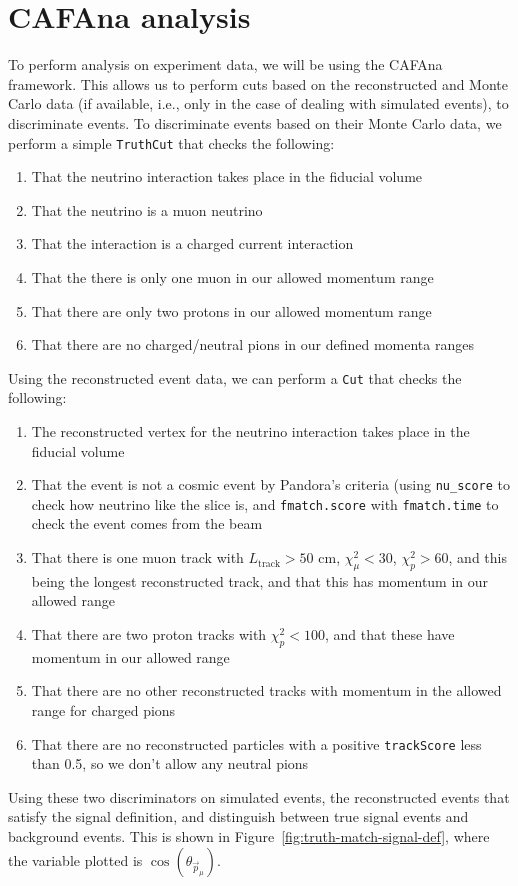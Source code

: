 \documentclass{article}
\begin{document}
\section{CAFAna analysis}

To perform analysis on experiment data, we will be using the CAFAna framework. This allows us to perform cuts based on the reconstructed and Monte Carlo data (if available, i.e., only in the case of dealing with simulated events), to discriminate events. To discriminate events based on their Monte Carlo data, we perform a simple \verb|TruthCut| that checks the following:
\begin{enumerate}[label=(\roman*)]
    \item That the neutrino interaction takes place in the fiducial volume
    \item That the neutrino is a muon neutrino
    \item That the interaction is a charged current interaction
    \item That the there is only one muon in our allowed momentum range
    \item That there are only two protons in our allowed momentum range
    \item That there are no charged/neutral pions in our defined momenta ranges
\end{enumerate}
Using the reconstructed event data, we can perform a \verb|Cut| that checks the following:
\begin{enumerate}[label=(\roman*)]
    \item The reconstructed vertex for the neutrino interaction takes place in the fiducial volume
    \item That the event is not a cosmic event by Pandora's criteria (using \verb|nu_score| to check how neutrino like the slice is, and \verb|fmatch.score| with \verb|fmatch.time| to check the event comes from the beam
    \item That there is one muon track with $L_{\text{track}} > 50$ cm, $\chi^2_\mu < 30$, $\chi^2_p > 60$, and this being the longest reconstructed track, and that this has momentum in our allowed range
    \item That there are two proton tracks with $\chi^2_p < 100$, and that these have momentum in our allowed range
    \item That there are no other reconstructed tracks with momentum in the allowed range for charged pions
    \item That there are no reconstructed particles with a positive \verb|trackScore| less than 0.5, so we don't allow any neutral pions
\end{enumerate}
Using these two discriminators on simulated events, the reconstructed events that satisfy the signal definition, and distinguish between true signal events and background events. This is shown in Figure~\ref{fig:truth-match-signal-def}, where the variable plotted is $\cos(\theta_{\vec{p}_{\mu}})$.
\end{document}

